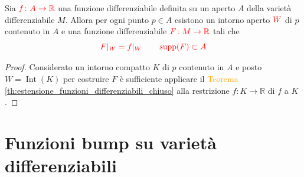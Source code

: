         \begin{corollario}
        \label{cor:estensione_locale_funzione_aperto}
        \mbox{}

        Sia $\textcolor{red}{f \colon A \to \mathbb{R}}$ una funzione differenziabile definita su un aperto $A$ della varietà differenziabile $M$. Allora per ogni punto $p \in A$ esistono un intorno aperto $\textcolor{red}{W}$ di $p$ contenuto in $A$ e una funzione differenziabile $\textcolor{red}{F \colon M \to \mathbb{R}}$ tali che
        \[
        \textcolor{red}{F|_W = f|_W \qquad \operatorname{supp}(F) \subset A}
        \]
        \end{corollario}

        \begin{proof}
        Considerato un intorno compatto $K$ di $p$ contenuto in $A$ e posto $W = \operatorname{Int}(K)$ per costruire $F$ è sufficiente applicare il \textcolor{orange}{Teorema \ref{th:estensione_funzioni_differenziabili_chiuso}} alla restrizione $f \colon K \to \mathbb{R}$ di $f$ a $K$.
        \end{proof}
    \section{Funzioni bump su varietà differenziabili}